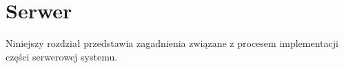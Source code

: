 \chapter{Serwer}
\label{chap:server}

    Niniejszy rozdział przedstawia zagadnienia związane z procesem implementacji części serwerowej systemu.
